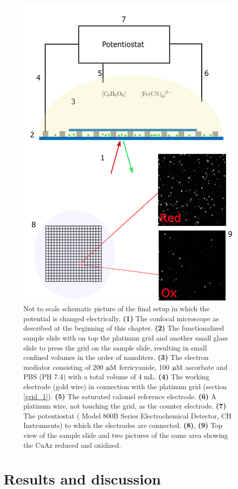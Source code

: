 \documentclass[twoside,single]{lion-msc}
\begin{document}
\begin{figure}[ht!]
\centering
\includegraphics[width=.75 \textwidth]{final_setup}
\caption{Not to scale schematic picture of the final setup in which the potential is changed electrically. \textbf{(1)} The confocal microscope as described at the beginning of this chapter. \textbf{(2)} The functionalized sample slide with on top the platinum grid and another small glass slide to press the grid on the sample slide, resulting in small confined volumes in the order of nanoliters. \textbf{(3)} The electron mediator consisting of 200 $\upmu \textup{M}$ ferricyanide, 100 $\upmu \textup{M}$ ascorbate and PBS (PH 7.4) with a total volume of 4 mL. \textbf{(4)} The working electrode (gold wire) in connection with the platinum grid (section \ref{grid_1}). \textbf{(5)} The saturated calomel reference electrode. \textbf{(6)} A platinum wire, not touching the grid, as the counter electrode. \textbf{(7)} The potentiostat ( Model 800B Series Electrochemical Detector, CH Instruments) to which the electrodes are connected. \textbf{(8)}, \textbf{(9)} Top view of the sample slide and two pictures of the same area showing the CuAz reduced and oxidized.}
\label{final_setup}
\end{figure}

\chapter{Results and discussion}
\end{document}
